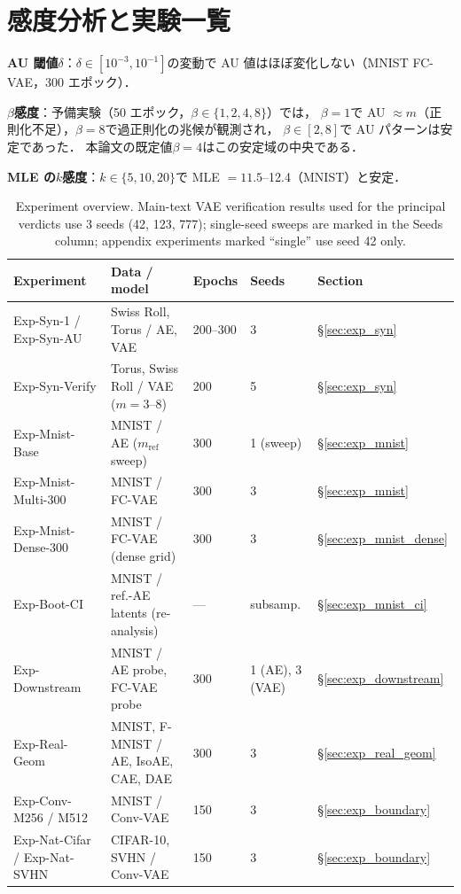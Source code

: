 \documentclass[11pt,a4paper]{jsarticle}
\begin{document}
\section{感度分析と実験一覧}\label{app:sens}

\textbf{AU 閾値$\delta$}：$\delta \in [10^{-3}, 10^{-1}]$の変動で
AU 値はほぼ変化しない（MNIST FC-VAE，300 エポック）．

\textbf{$\beta$感度}：予備実験（50 エポック，$\beta \in \{1, 2, 4, 8\}$）では，
$\beta = 1$で AU $\approx m$（正則化不足），$\beta = 8$で過正則化の兆候が観測され，
$\beta \in [2, 8]$で AU パターンは安定であった．
本論文の既定値$\beta = 4$はこの安定域の中央である．

\textbf{MLE の$k$感度}：$k \in \{5, 10, 20\}$で MLE $= 11.5$--12.4（MNIST）と安定．

\begin{table}[H]
\centering
\caption{Experiment overview. Main-text VAE verification results used for
the principal verdicts use 3 seeds (42, 123, 777); single-seed sweeps are
marked in the Seeds column; appendix experiments marked ``single'' use
seed 42 only.}
\label{tab:exp_list}
\small
\begin{tabular}{p{3.4cm}p{3.4cm}p{2.2cm}p{1.6cm}p{2.2cm}}
\toprule
Experiment & Data / model & Epochs & Seeds & Section \\
\midrule
Exp-Syn-1 / Exp-Syn-AU & Swiss Roll, Torus / AE, VAE & 200--300 & 3 & §\ref{sec:exp_syn} \\
Exp-Syn-Verify & Torus, Swiss Roll / VAE ($m = 3$--$8$) & 200 & 5 & §\ref{sec:exp_syn} \\
Exp-Mnist-Base & MNIST / AE ($m_{\mathrm{ref}}$ sweep) & 300 & 1 (sweep) & §\ref{sec:exp_mnist} \\
Exp-Mnist-Multi-300 & MNIST / FC-VAE & 300 & 3 & §\ref{sec:exp_mnist} \\
Exp-Mnist-Dense-300 & MNIST / FC-VAE (dense grid) & 300 & 3 & §\ref{sec:exp_mnist_dense} \\
Exp-Boot-CI & MNIST / ref.-AE latents (re-analysis) & --- & subsamp. & §\ref{sec:exp_mnist_ci} \\
Exp-Downstream & MNIST / AE probe, FC-VAE probe & 300 & 1 (AE), 3 (VAE) & §\ref{sec:exp_downstream} \\
Exp-Real-Geom & MNIST, F-MNIST / AE, IsoAE, CAE, DAE & 300 & 3 & §\ref{sec:exp_real_geom} \\
Exp-Conv-M256 / M512 & MNIST / Conv-VAE & 150 & 3 & §\ref{sec:exp_boundary} \\
Exp-Nat-Cifar / Exp-Nat-SVHN & CIFAR-10, SVHN / Conv-VAE & 150 & 3 & §\ref{sec:exp_boundary} \\

\end{tabular}
\end{table}
\end{document}
